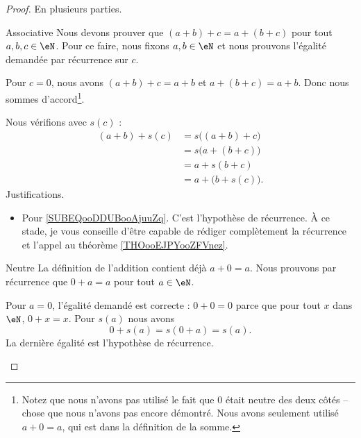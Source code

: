 \begin{proof}
    En plusieurs parties.
    \begin{subproof}
    \item[Associative]
        Nous devons prouver que \( (a+b)+c=a+(b+c)\) pour tout \( a,b,c\in \eN\). Pour ce faire, nous fixons \( a,b\in\eN\) et nous prouvons l'égalité demandée par récurrence sur \( c\).

        Pour \( c=0\), nous avons \( (a+b)+c=a+b\) et \( a+(b+c)=a+b\). Donc nous sommes d'accord\footnote{Notez que nous n'avons pas utilisé le fait que \( 0\) était neutre des deux côtés -- chose que nous n'avons pas encore démontré. Nous avons seulement utilisé \( a+0=a\), qui est dans la définition de la somme.}.

        Nous vérifions avec \( s(c)\) :
        \begin{subequations}
            \begin{align}
                (a+b)+s(c)&=s\big( (a+b)+c \big)\\
                &=s\big( a+(b+c) \big)      \label{SUBEQooDDUBooAjuuZq}\\
                &=a+s(b+c)\\
                &=a+\big( b+s(c) \big).
            \end{align}
        \end{subequations}
        Justifications.
        \begin{itemize}
            \item Pour \eqref{SUBEQooDDUBooAjuuZq}. C'est l'hypothèse de récurrence. À ce stade, je vous conseille d'être capable de rédiger complètement la récurrence et l'appel au théorème \ref{THOooEJPYooZFVnez}.
        \end{itemize}
    \item[Neutre]
        La définition de l'addition contient déjà \( a+0=a\). Nous prouvons par récurrence que \( 0+a=a\) pour tout \( a\in \eN\).

        Pour \( a=0\), l'égalité demandé est correcte : \( 0+0=0\) parce que pour tout \( x\) dans \( \eN\), \( 0+x=x\). Pour \( s(a)\) nous avons
        \begin{equation}
            0+s(a)=s(0+a)=s(a).
        \end{equation}
        La dernière égalité est l'hypothèse de récurrence.


\end{subproof}
\end{proof}
